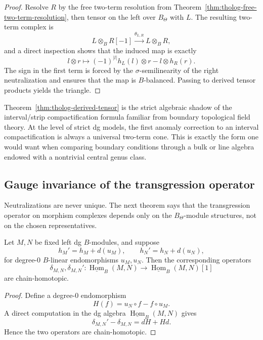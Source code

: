 \begin{proof}
Resolve \(R\) by the free two-term resolution from Theorem~\ref{thm:tholog-free-two-term-resolution}, then tensor on the left over \(B_{\Theta}\) with \(L\).
The resulting two-term complex is
\[
L\otimes_{B}R[-1]\xrightarrow{\theta_{L,R}}L\otimes_{B}R,
\]
and a direct inspection shows that the induced map is exactly
\[
l\otimes r\longmapsto (-1)^{|l|}h_{L}(l)\otimes r-l\otimes h_{R}(r).
\]
The sign in the first term is forced by the \(\sigma\)-semilinearity of the right neutralization and ensures that the map is \(B\)-balanced.
Passing to derived tensor products yields the triangle.
\end{proof}

\begin{remark}
Theorem~\ref{thm:tholog-derived-tensor} is the strict algebraic shadow of the interval/strip compactification formula familiar from boundary topological field theory.
At the level of strict dg models, the first anomaly correction to an interval compactification is always a universal two-term cone.
This is exactly the form one would want when comparing boundary conditions through a bulk or line algebra endowed with a nontrivial central genus class.
\end{remark}

\subsection{Gauge invariance of the transgression operator}

Neutralizations are never unique.
The next theorem says that the transgression operator on morphism complexes depends only on the \(B_{\Theta}\)-module structures, not on the chosen representatives.

\begin{theorem}
Let \(M,N\) be fixed left dg \(B\)-modules, and suppose
\[
h_{M}'=h_{M}+d(u_{M}),
\qquad
h_{N}'=h_{N}+d(u_{N}),
\]
for degree-\(0\) \(B\)-linear endomorphisms \(u_{M},u_{N}\).
Then the corresponding operators
\[
\delta_{M,N},\delta_{M,N}' :
\underline{\operatorname{Hom}}_{B}(M,N)\to
\underline{\operatorname{Hom}}_{B}(M,N)[1]
\]
are chain-homotopic.
\end{theorem}

\begin{proof}
Define a degree-\(0\) endomorphism
\[
H(f)=u_{N}\circ f-f\circ u_{M}.
\]
A direct computation in the dg algebra \(\underline{\operatorname{Hom}}_{B}(M,N)\) gives
\[
\delta_{M,N}'-\delta_{M,N}=dH+Hd.
\]
Hence the two operators are chain-homotopic.
\end{proof}

